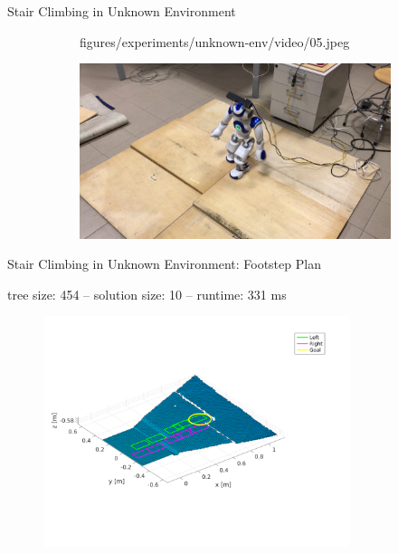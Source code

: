\documentclass[10pt]{beamer}
\begin{document}
\begin{frame}{Stair Climbing in Unknown Environment}
\begin{figure}
\begin{subfigure}{0.40\textwidth}
				{figures/experiments/unknown-env/video/05.jpeg}
		\end{subfigure}\hspace{0.05cm}%
		\begin{subfigure}{0.40\textwidth}
			\includegraphics[width=\linewidth]
				{figures/experiments/unknown-env/video/06.jpeg}
		\end{subfigure}
	\end{figure}
\end{frame}

\begin{frame}{Stair Climbing in Unknown Environment: Footstep Plan}
	\begin{center}
    tree size: 454 -- solution size: 10 -- runtime: 331 ms
  \end{center}
	\begin{figure}
		\centering
		\includegraphics[width=0.8\textwidth]
				{figures/experiments/unknown-env/footstep-plan.pdf}
	\end{figure}
\end{frame}
\end{document}
